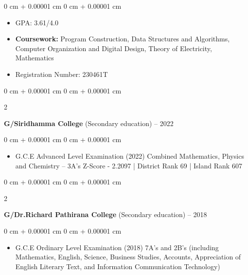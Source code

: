 \documentclass[10pt, letterpaper]{article}
\newenvironment{highlights}{
    \begin{itemize}[
        topsep=0.10 cm,
        parsep=0.10 cm,
        partopsep=0pt,
        itemsep=0pt,
        leftmargin=0 cm + 10pt
    ]
}{
    \end{itemize}
} %
\newenvironment{onecolentry}{
    \begin{adjustwidth}{
        0 cm + 0.00001 cm
    }{
        0 cm + 0.00001 cm
    }
}{
    \end{adjustwidth}
} %
\newenvironment{twocolentry}[2][]{
    \onecolentry
    \def\secondColumn{#2}
    \setcolumnwidth{\fill, 4.5 cm}
    \begin{paracol}{2}
}{
    \switchcolumn \raggedleft \secondColumn
    \end{paracol}
    \endonecolentry
} %
\begin{document}
        \vspace{0.10 cm}
        \begin{onecolentry}
            \begin{highlights}
                \item GPA: 3.61/4.0 
                \item \textbf{Coursework:} Program Construction, Data Structures and Algorithms, Computer Organization and Digital Design, Theory of Electricity, Mathematics
                \item Registration Number: 230461T
            \end{highlights}
        \end{onecolentry}
        \vspace{0.30 cm}
        \begin{twocolentry}{
            2019 – 2022 
        }
            \textbf{G/Siridhamma College} (Secondary education)\end{twocolentry}

        \vspace{0.10 cm}
        \begin{onecolentry}
            \begin{highlights}
                \item G.C.E Advanced Level Examination (2022)
                Combined Mathematics, Physics and Chemistry – 3A's
                Z-Score - 2.2097 | District Rank 69 | Island Rank 607
            \end{highlights}
        \end{onecolentry}
        \vspace{0.30 cm}
        \begin{twocolentry}{
            2009 – 2018
        }
            \textbf{G/Dr.Richard Pathirana College} (Secondary education)\end{twocolentry}

        \vspace{0.10 cm}
        \begin{onecolentry}
            \begin{highlights}
                \item G.C.E Ordinary Level Examination (2018)
                7A's and 2B's (including Mathematics, English, Science, Business Studies, Accounts, Appreciation of English Literary Text, and Information Communication Technology)
            \end{highlights}
        \end{onecolentry}
\end{document}
